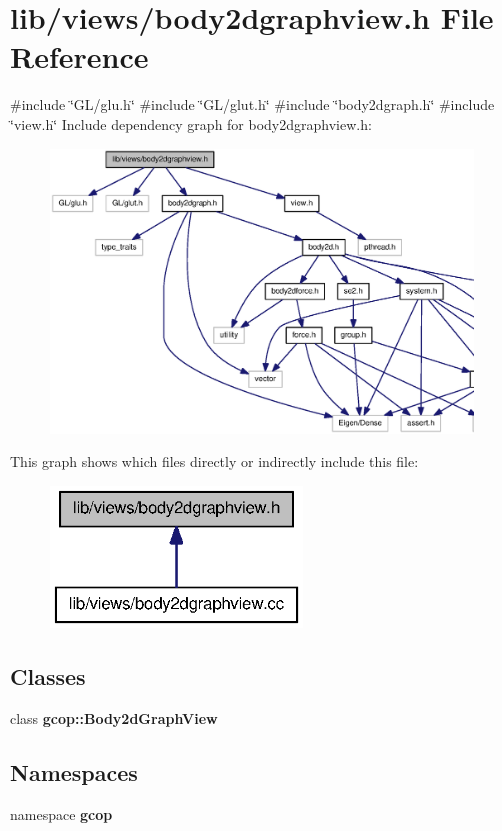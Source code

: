 \section{lib/views/body2dgraphview.h \-File \-Reference}
\label{body2dgraphview_8h}
{\ttfamily \#include \char`\"{}\-G\-L/glu.\-h\char`\"{}}\*
{\ttfamily \#include \char`\"{}\-G\-L/glut.\-h\char`\"{}}\*
{\ttfamily \#include \char`\"{}body2dgraph.\-h\char`\"{}}\*
{\ttfamily \#include \char`\"{}view.\-h\char`\"{}}\*
\-Include dependency graph for body2dgraphview.\-h\-:
\nopagebreak
\begin{figure}[H]
\begin{center}
\leavevmode
\includegraphics[width=350pt]{body2dgraphview_8h__incl}
\end{center}
\end{figure}
\-This graph shows which files directly or indirectly include this file\-:
\nopagebreak
\begin{figure}[H]
\begin{center}
\leavevmode
\includegraphics[width=190pt]{body2dgraphview_8h__dep__incl}
\end{center}
\end{figure}
\subsection*{\-Classes}
\begin{DoxyCompactItemize}
\item 
class {\bf gcop\-::\-Body2d\-Graph\-View}
\end{DoxyCompactItemize}
\subsection*{\-Namespaces}
\begin{DoxyCompactItemize}
\item 
namespace {\bf gcop}
\end{DoxyCompactItemize}
